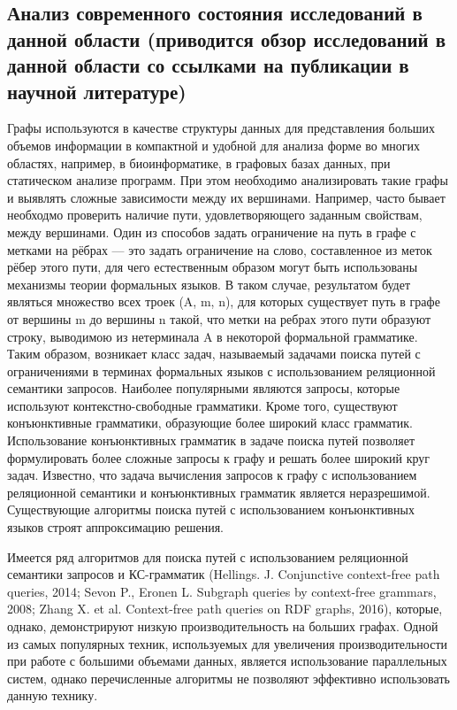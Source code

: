\documentclass[12pt]{article}  %
\theoremstyle{remark}
\begin{document}
\subsection{Анализ современного состояния исследований в данной области (приводится обзор исследований в данной области со ссылками на публикации в научной литературе)}
Графы используются в качестве структуры данных для представления больших объемов информации в компактной и удобной для анализа форме во многих областях, например, в биоинформатике, в графовых базах данных, при статическом анализе программ. При этом необходимо анализировать такие графы и выявлять сложные зависимости между их вершинами. Например, часто бывает необходмо проверить наличие пути, удовлетворяющего заданным свойствам, между вершинами. Один из способов задать ограничение на путь в графе с метками на рёбрах --- это задать ограничение на слово, составленное из меток рёбер этого пути, для чего естественным образом могут быть использованы механизмы теории формальных языков. В таком случае, результатом будет являться множество всех троек (A, m, n), для которых существует путь в графе от вершины m до вершины n такой, что метки на ребрах этого пути образуют строку, выводимою из нетерминала A в некоторой формальной грамматике. Таким образом, возникает класс задач, называемый задачами поиска путей с ограничениями в терминах формальных языков с использованием реляционной семантики запросов. Наиболее популярными являются запросы, которые используют контекстно-свободные грамматики. Кроме того, существуют конъюнктивные грамматики, образующие более широкий класс грамматик. Использование конъюнктивных грамматик в задаче поиска путей позволяет формулировать более сложные запросы к графу и решать более широкий круг задач. Известно, что задача вычисления запросов к графу с использованием реляционной семантики и конъюнктивных грамматик является неразрешимой. Существующие алгоритмы поиска путей с использованием конъюнктивных языков строят аппроксимацию решения.

Имеется ряд алгоритмов для поиска путей с использованием реляционной семантики запросов и КС-грамматик (Hellings. J. Conjunctive context-free path queries, 2014; Sevon P., Eronen L. Subgraph queries by context-free grammars, 2008; Zhang X. et al. Context-free path queries on RDF graphs, 2016), которые, однако, демонстрируют низкую производительность на больших графах. Одной из самых популярных техник, используемых для увеличения производительности при работе с большими объемами данных, является использование параллельных систем, однако перечисленные алгоритмы не позволяют эффективно использовать данную технику.
\end{document}
